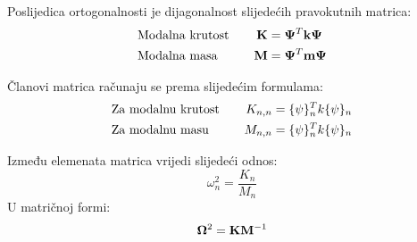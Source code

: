 Poslijedica ortogonalnosti je dijagonalnost slijedećih pravokutnih matrica:
\begin{alignat}{2}
    &\text{Modalna krutost}\quad & \mathbf{K}&=\mathbf{\Psi}^T\mathbf{k}\mathbf{\Psi}\label{eq:modalna_krutost_matrica}\\
    &\text{Modalna masa}\quad &\mathbf{M}&=\mathbf{\Psi}^T\mathbf{m}\mathbf{\Psi}\label{eq:modalna_masa_matrica}
\end{alignat}

Članovi matrica računaju se prema slijedećim formulama:
\begin{alignat}{2}
    &\text{Za modalnu krutost}\quad & K_{n,n}&=\vtor{\psi}{}_n^Tk\vtor{\psi}{}_n\label{eq:modalna_krutost}\\
    &\text{Za modalnu masu}\quad &M_{n,n}&=\vtor{\psi}{}_n^Tk\vtor{\psi}{}_n\label{eq:modalna_masa}
\end{alignat}

Između elemenata matrica vrijedi slijedeći odnos:
\begin{equation}
    \omega_n^2=\frac{K_n}{M_n}
\end{equation}
U matričnoj formi:
\begin{equation}
    \mathbf{\Omega}^2=\mathbf{K}\mathbf{M}^{-1}
\end{equation}

